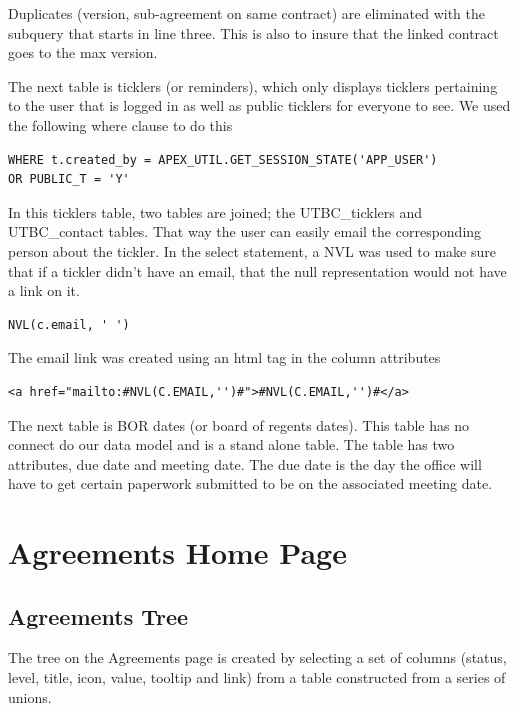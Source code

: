 \documentclass{report}
\begin{document}
Duplicates (version, sub-agreement on same contract) are eliminated with the subquery that starts in line three. This is also to insure that the linked contract goes to the max version.

The next table is ticklers (or reminders), which only displays ticklers pertaining to the user that is logged in as well as public ticklers for everyone to see. We used the following where clause to do this

\begin{lstlisting}[caption=Tickler table where clause]
WHERE t.created_by = APEX_UTIL.GET_SESSION_STATE('APP_USER')
OR PUBLIC_T = 'Y'
\end{lstlisting}

In this ticklers table, two tables are joined; the UTBC\_ticklers and UTBC\_contact tables. That way the user can easily email the corresponding person about the tickler. In the select statement, a NVL was used to make sure that if a tickler didn't have an email, that the null representation would not have a link on it.

\begin{lstlisting}
NVL(c.email, ' ')
\end{lstlisting}

The email link was created using an html tag in the column attributes

\begin{lstlisting}[caption = Email link in html tag]
<a href="mailto:#NVL(C.EMAIL,'')#">#NVL(C.EMAIL,'')#</a>
\end{lstlisting}

The next table is BOR dates (or board of regents dates). This table has no connect do our data model and is a stand alone table. The table has two attributes, due date and meeting date. The due date is the day the office will have to get certain paperwork submitted to be on the associated meeting date.

\section{Agreements Home Page}

\subsection{Agreements Tree}
The tree on the Agreements page is created by selecting a set of columns (status, level, title, icon, value, tooltip and link) from a table constructed from a series of unions.
\end{document}
